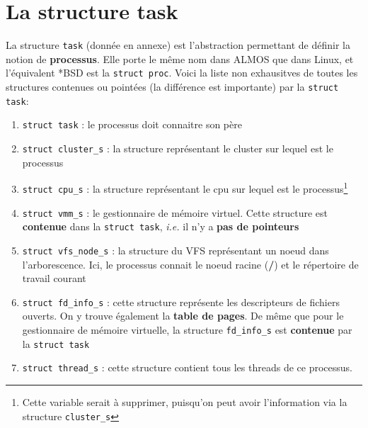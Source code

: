 \section{La structure task} \label{sec:task}

La structure \texttt{task} (donnée en annexe) est l'abstraction permettant de
définir la notion de \textbf{processus}. Elle porte le même nom dans ALMOS que
dans Linux, et l'équivalent *BSD est la \texttt{struct proc}.  Voici la liste
non exhausitves de toutes les structures contenues ou pointées (la différence
est importante) par la \texttt{struct task}:

  \begin{enumerate}[-]

    \item \texttt{struct task} : le processus doit connaitre son père
        
    \item \texttt{struct cluster\_s} : la structure représentant le cluster sur
      lequel est le processus
    
    \item \texttt{struct cpu\_s} : la structure représentant le cpu sur lequel
      est le processus\footnote{Cette variable serait à supprimer, puisqu'on
      peut avoir l'information via la structure \texttt{cluster\_s}}

    \item \texttt{struct vmm\_s} : le gestionnaire de mémoire virtuel.  Cette
      structure est \textbf{contenue} dans la \texttt{struct task}, \emph{i.e.}
      il n'y a \textbf{pas de pointeurs}

    \item \texttt{struct vfs\_node\_s} : la structure du VFS représentant un
      noeud dans l'arborescence. Ici, le processus connait le noeud racine
      (\textbf{/}) et le répertoire de travail courant

    \item \texttt{struct fd\_info\_s} : cette structure représente les
      descripteurs de fichiers ouverts. On y trouve également la \textbf{table
      de pages}. De même que pour le gestionnaire de mémoire virtuelle, la
      structure \texttt{fd\_info\_s} est \textbf{contenue} par la \texttt{struct
      task}
          
    \item \texttt{struct thread\_s} : cette structure contient tous les threads
      de ce processus.

  \end{enumerate}

